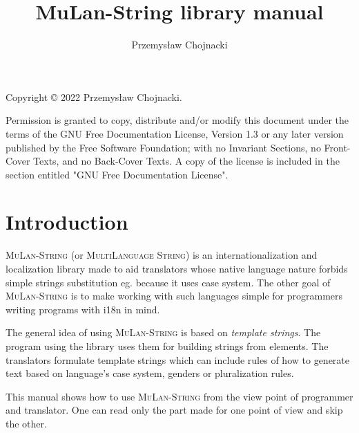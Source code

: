 \documentclass[a4paper]{article}
\title{MuLan-String library manual}
\author{Przemys\l{}aw Chojnacki}
\def\mulan{\textsc{MuLan-String}}
\begin{document}
\maketitle
\vfill
    Copyright © 2022  Przemysław Chojnacki. \par
    Permission is granted to copy, distribute and/or modify this document
    under the terms of the GNU Free Documentation License, Version 1.3
    or any later version published by the Free Software Foundation;
    with no Invariant Sections, no Front-Cover Texts, and no Back-Cover Texts.
    A copy of the license is included in the section entitled "GNU
    Free Documentation License".
\pagebreak
\tableofcontents

\pagebreak

\section{Introduction}

\mulan{} (or \textsc{MultiLanguage String}) is an internationalization and localization library made to aid translators whose native language nature forbids simple strings substitution eg. because it uses case system.
The other goal of \mulan{} is to make working with such languages simple for programmers writing programs with i18n in mind. 

The general idea of using \mulan{} is based on \emph{template strings}. The program using the library uses them for building strings from elements. 
The translators formulate template strings which can include rules of how to generate text based on language's case system, genders or pluralization rules.

This manual shows how to use \mulan{} from the view point of programmer and translator. One can read only the part made for one point of view and skip the other. 


 \pagebreak
 \pagebreak


\pagebreak
\appendix

\end{document}
